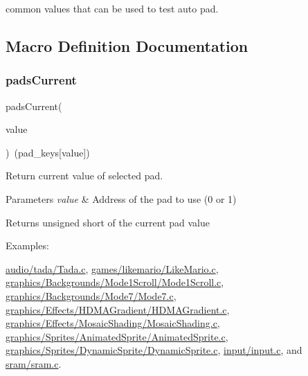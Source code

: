 common values that can be used to test auto pad. 

\subsection{Macro Definition Documentation}
\mbox{\label{a00305_a6063e0eec9a36e437fc32951acafa44c}} 
\subsubsection{\texorpdfstring{pads\+Current}{padsCurrent}}
{\footnotesize\ttfamily pads\+Current(\begin{DoxyParamCaption}\item[{}]{value }\end{DoxyParamCaption})~(pad\+\_\+keys\mbox{[}value\mbox{]})}



Return current value of selected pad. 


\begin{DoxyParams}{Parameters}
{\em value} & Address of the pad to use (0 or 1) \\
\hline
\end{DoxyParams}
\begin{DoxyReturn}{Returns}
unsigned short of the current pad value 
\end{DoxyReturn}
\begin{Desc}
\item[Examples\+: ]\par
\hyperlink{a00394}{audio/tada/\+Tada.\+c}, \hyperlink{a00390}{games/likemario/\+Like\+Mario.\+c}, \hyperlink{a00366}{graphics/\+Backgrounds/\+Mode1\+Scroll/\+Mode1\+Scroll.\+c}, \hyperlink{a00372}{graphics/\+Backgrounds/\+Mode7/\+Mode7.\+c}, \hyperlink{a00374}{graphics/\+Effects/\+H\+D\+M\+A\+Gradient/\+H\+D\+M\+A\+Gradient.\+c}, \hyperlink{a00376}{graphics/\+Effects/\+Mosaic\+Shading/\+Mosaic\+Shading.\+c}, \hyperlink{a00382}{graphics/\+Sprites/\+Animated\+Sprite/\+Animated\+Sprite.\+c}, \hyperlink{a00384}{graphics/\+Sprites/\+Dynamic\+Sprite/\+Dynamic\+Sprite.\+c}, \hyperlink{a00386}{input/input.\+c}, and \hyperlink{a00398}{sram/sram.\+c}.\end{Desc}
\mbox{\label{a00305_a3cae01317d787d65697fdf0543714272}} 
